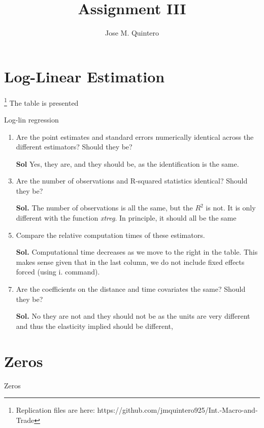 \documentclass[12pt,oneside,reqno]{amsart}
\title{Assignment III}
\author{Jose M. Quintero}
\begin{document}
\maketitle 

\section{Log-Linear Estimation}\footnote{Replication files are here: https://github.com/jmquintero925/Int.-Macro-and-Trade}
The table is presented 
\begin{table}[htb]
    \caption{Log-lin regression}
    \label{tab:my_label}
    
\end{table}

\begin{enumerate}[leftmargin=*,label=\textbf{(\roman*)}]
    \item Are the point estimates and standard errors numerically identical across the different estimators? Should they be?
    \item[\textbf{Sol}] Yes, they are, and they should be, as the identification is the same. 
    \item Are the number of observations and R-squared statistics identical? Should they be?
    \item[\textbf{Sol.}] The number of observations is all the same, but the $R^2$ is not. It is only different with the function \textit{xtreg}. In principle, it should all be the same
    \item Compare the relative computation times of these estimators.
    \item[\textbf{Sol.}] Computational time decreases as we move to the right in the table. This makes sense given that in the last column, we do not include fixed effects forced (using i. command). 
    \item Are the coefficients on the distance and time covariates the same? Should they be?
    \item[\textbf{Sol.}] No they are not and they should not be as the units are very different and thus the elasticity implied should be different, 
\end{enumerate}

\clearpage
\section{Zeros}

\begin{table}[htb]
    \caption{Zeros}
    \label{tab:my_label}
    \resizebox{\textwidth}{!}{
    
    }
\end{table}
\end{document}
